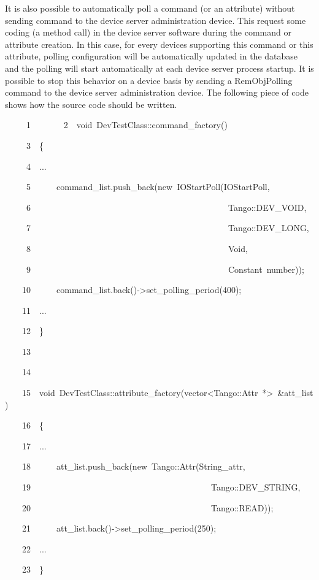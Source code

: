 It is also possible to automatically poll a command (or an attribute)
without sending command to the device server administration device.
This request some coding (a method call) in the device server software
during the command or attribute creation. In this case, for every
devices supporting this command or this attribute, polling configuration
will be automatically updated in the database and the polling will
start automatically at each device server process startup. It is possible
to stop this behavior on a device basis by sending a RemObjPolling
command to the device server administration device. The following
piece of code shows how the source code should be written.



\begin{lyxcode}
~~~~~1~~
~~~~~2~~void~DevTestClass::command\_factory()

~~~~~3~~\{

~~~~~4~~...

~~~~~5~~~~~~command\_list.push\_back(new~IOStartPoll(\textquotedbl{}IOStartPoll\textquotedbl{},

~~~~~6~~~~~~~~~~~~~~~~~~~~~~~~~~~~~~~~~~~~~~~~~~~~~~Tango::DEV\_VOID,

~~~~~7~~~~~~~~~~~~~~~~~~~~~~~~~~~~~~~~~~~~~~~~~~~~~~Tango::DEV\_LONG,

~~~~~8~~~~~~~~~~~~~~~~~~~~~~~~~~~~~~~~~~~~~~~~~~~~~~\textquotedbl{}Void\textquotedbl{},

~~~~~9~~~~~~~~~~~~~~~~~~~~~~~~~~~~~~~~~~~~~~~~~~~~~~\textquotedbl{}Constant~number\textquotedbl{}));

~~~~10~~~~~~command\_list.back()->set\_polling\_period(400);

~~~~11~~...

~~~~12~~\}

~~~~13~~

~~~~14~~

~~~~15~~void~DevTestClass::attribute\_factory(vector<Tango::Attr~{*}>~\&att\_list)

~~~~16~~\{

~~~~17~~...

~~~~18~~~~~~att\_list.push\_back(new~Tango::Attr(\textquotedbl{}String\_attr\textquotedbl{},

~~~~19~~~~~~~~~~~~~~~~~~~~~~~~~~~~~~~~~~~~~~~~~~Tango::DEV\_STRING,

~~~~20~~~~~~~~~~~~~~~~~~~~~~~~~~~~~~~~~~~~~~~~~~Tango::READ));

~~~~21~~~~~~att\_list.back()->set\_polling\_period(250);

~~~~22~~...

~~~~23~~\}
\end{lyxcode}


